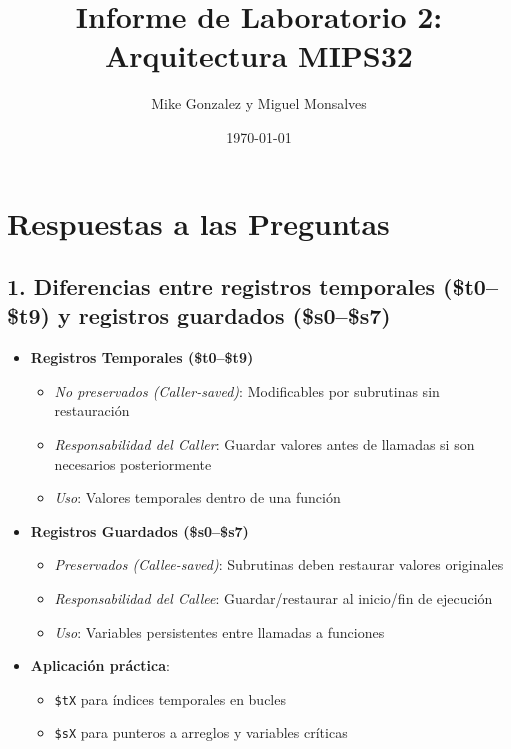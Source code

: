 \documentclass{article}
\title{Informe de Laboratorio 2: Arquitectura MIPS32}
\author{Mike Gonzalez y Miguel Monsalves}
\date{\today}
\begin{document}
\maketitle

\section*{Respuestas a las Preguntas}

\subsection*{1. Diferencias entre registros temporales (\$t0–\$t9) y registros guardados (\$s0–\$s7)}
\begin{itemize}
  \item \textbf{Registros Temporales (\$t0–\$t9)}
  \begin{itemize}
    \item \textit{No preservados (Caller-saved)}: Modificables por subrutinas sin restauración
    \item \textit{Responsabilidad del Caller}: Guardar valores antes de llamadas si son necesarios posteriormente
    \item \textit{Uso}: Valores temporales dentro de una función
  \end{itemize}
  
  \item \textbf{Registros Guardados (\$s0–\$s7)}
  \begin{itemize}
    \item \textit{Preservados (Callee-saved)}: Subrutinas deben restaurar valores originales
    \item \textit{Responsabilidad del Callee}: Guardar/restaurar al inicio/fin de ejecución
    \item \textit{Uso}: Variables persistentes entre llamadas a funciones
  \end{itemize}
  
  \item \textbf{Aplicación práctica}: 
  \begin{itemize}
    \item \texttt{\$tX} para índices temporales en bucles
    \item \texttt{\$sX} para punteros a arreglos y variables críticas
  \end{itemize}
\end{itemize}
\end{document}
